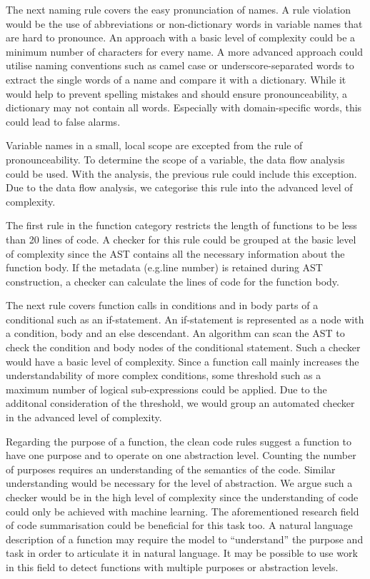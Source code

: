 The next naming rule covers the easy pronunciation of names. A rule violation would be the use of abbreviations or non-dictionary words in variable names that are hard to pronounce. An approach with a basic level of complexity could be a minimum number of characters for every name. A more advanced approach could utilise naming conventions such as camel case or underscore-separated words to extract the single words of a name and compare it with a dictionary. While it would help to prevent spelling mistakes and should ensure pronounceability, a dictionary may not contain all words. Especially with domain-specific words, this could lead to false alarms.

Variable names in a small, local scope are excepted from the rule of pronounceability. To determine the scope of a variable, the data flow analysis could be used. With the analysis, the previous rule could include this exception. Due to the data flow analysis, we categorise this rule into the advanced level of complexity.



The first rule in the function category restricts the length of functions to be less than 20 lines of code. A checker for this rule could be grouped at the basic level of complexity since the AST contains all the necessary information about the function body. If the metadata (e.g.line number) is retained during AST construction, a checker can calculate the lines of code for the function body.

The next rule covers function calls in conditions and in body parts of a conditional such as an if-statement. An if-statement is represented as a node with a condition, body and an else descendant. An algorithm can scan the AST to check the condition and body nodes of the conditional statement. Such a checker would have a basic level of complexity. Since a function call mainly increases the understandability of more complex conditions, some threshold such as a maximum number of logical sub-expressions could be applied. Due to the additonal consideration of the threshold, we would group an automated checker in the advanced level of complexity.

Regarding the purpose of a function, the clean code rules suggest a function to have one purpose and to operate on one abstraction level. Counting the number of purposes requires an understanding of the semantics of the code. Similar understanding would be necessary for the level of abstraction. We argue such a checker would be in the high level of complexity since the understanding of code could only be achieved with machine learning. The aforementioned research field of code summarisation could be beneficial for this task too. A natural language description of a function may require the model to \enquote{understand} the purpose and task in order to articulate it in natural language. It may be possible to use work in this field to detect functions with multiple purposes or abstraction levels.
 
